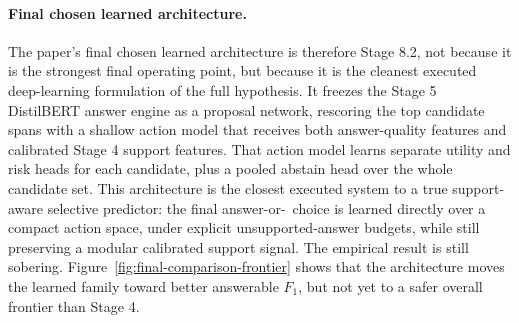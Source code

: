 \paragraph{Final chosen learned architecture.}
The paper's final chosen learned architecture is therefore Stage 8.2, not
because it is the strongest final operating point, but because it is the
cleanest executed deep-learning formulation of the full hypothesis.
It freezes the Stage 5 DistilBERT answer engine as a proposal network,
rescoring the top candidate spans with a shallow action model that receives
both answer-quality features and calibrated Stage 4 support features.
That action model learns separate utility and risk heads for each candidate,
plus a pooled abstain head over the whole candidate set.
This architecture is the closest executed system to a true
support-aware selective predictor:
the final answer-or-\abstain\ choice is learned directly over a compact action
space, under explicit unsupported-answer budgets, while still preserving a
modular calibrated support signal.
The empirical result is still sobering.
Figure~\ref{fig:final-comparison-frontier} shows that the architecture moves
the learned family toward better answerable \(F_1\), but not yet to a safer
overall frontier than Stage 4.
